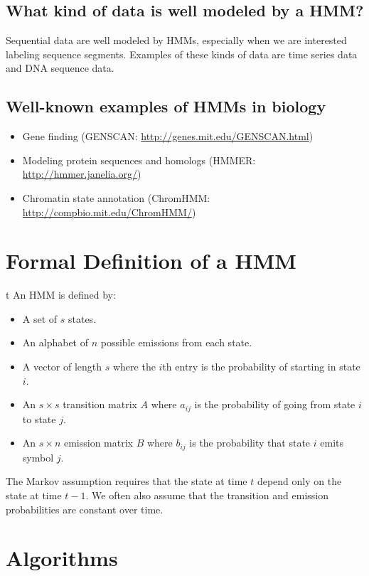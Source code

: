 \documentclass[11pt, oneside]{article}
\begin{document}
\subsection{What kind of data is well modeled by a HMM?}
Sequential data are well modeled by HMMs, especially when we are interested labeling sequence segments. Examples of these kinds of data are time series data and DNA sequence data. 

\subsection{Well-known examples of HMMs in biology}

\begin{itemize}
\item Gene finding (GENSCAN: \url{http://genes.mit.edu/GENSCAN.html})
\item Modeling protein sequences and homologs (HMMER: \url{http://hmmer.janelia.org/})
\item Chromatin state annotation (ChromHMM: \url{http://compbio.mit.edu/ChromHMM/})
\end{itemize}

\section{Formal Definition of a HMM}t
An HMM is defined by:
\begin{itemize}
\item A set of $s$ states.
\item An alphabet of $n$ possible emissions from each state.
\item A vector of length $s$ where the $i$th entry is the probability of starting in state $i$.
\item An $s\times s$ transition matrix $A$ where $a_{ij}$ is the probability of going from state $i$ to state $j$.
\item An $s \times n$ emission matrix $B$ where $b_{ij}$ is the probability that state $i$ emits symbol $j$.
\end{itemize}

The Markov assumption requires that the state at time $t$ depend only on the state at time $t-1$. We often also assume that the transition and emission probabilities are constant over time.

\section{Algorithms}
\end{document}

